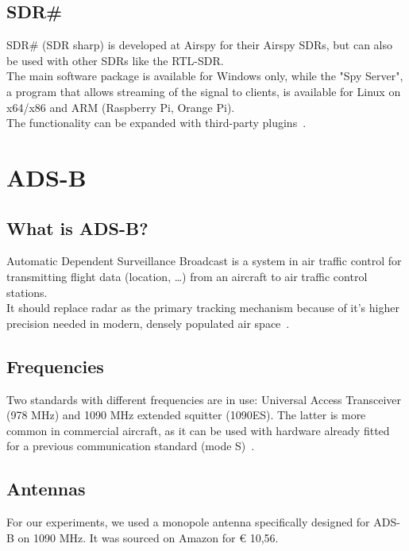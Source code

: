 \documentclass[conference]{IEEEtran}
\begin{document}
\subsection{SDR\#}
SDR\# (SDR sharp) is developed at Airspy for their Airspy SDRs, but can also be used with other SDRs like the RTL-SDR.\\The main software package is available for Windows only, while the "Spy Server", a program that allows streaming of the signal to clients, is available for Linux on x64/x86 and ARM (Raspberry Pi, Orange Pi).\\
The functionality can be expanded with third-party plugins~\cite{SDRsharp19Download}.

\section{ADS-B}
\subsection{What is ADS-B?}
Automatic Dependent Surveillance Broadcast is a system in air traffic control for transmitting flight data (location, \ldots) from an aircraft to air traffic control stations.\\
It should replace radar as the primary tracking mechanism because of it's higher precision needed in modern, densely populated air space~\cite{strohmeier2014realities}.
\subsection{Frequencies}
Two standards with different frequencies are in use: Universal Access Transceiver (978 MHz) and 1090 MHz extended squitter (1090ES). The latter is more common in commercial aircraft, as it can be used with hardware already fitted for a previous communication standard (mode S)~\cite{strohmeier2014realities}.
\subsection{Antennas}
For our experiments, we used a monopole antenna specifically designed for ADS-B on 1090 MHz. It was sourced on Amazon for € 10,56.
\end{document}
